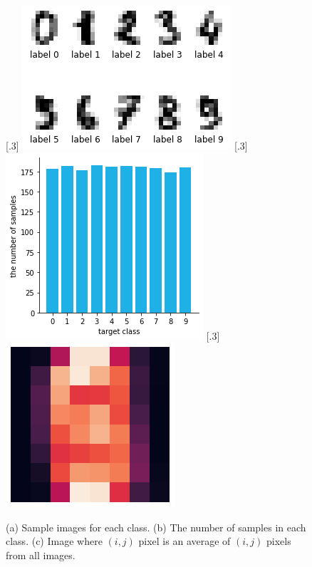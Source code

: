 \documentclass[main.tex]{subfiles}
\begin{document}
\begin{figure}[H]
	\centering
	[.3\textwidth] {
		\includegraphics[scale=0.5]{img/eda/data_examples.png}
	}
	[.3\textwidth] {
		\includegraphics[scale=0.45]{img/eda/data_dist.png}
	}
	[.3\textwidth] {
		\includegraphics[scale=0.5]{img/eda/data_mean.png}
	}
	
	\caption{(a) Sample images for each class. (b) The number of samples in each class. (c) Image where $(i, j)$ pixel is an average of $(i, j)$ pixels from all images.}
	\label{edafig}
\end{figure}
\end{document}
